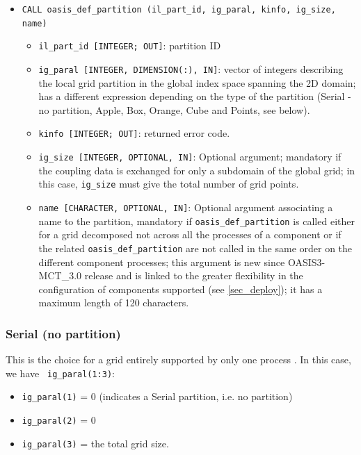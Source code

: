 \begin{itemize}

  \vspace{0.2cm}
\item {\tt CALL oasis\_def\_partition (il\_part\_id, ig\_paral,
    kinfo, ig\_size, name)} 

  \begin{itemize}
  \item {\tt il\_part\_id [INTEGER; OUT]}: partition ID
  \item {\tt ig\_paral [INTEGER, DIMENSION(:), IN]}: vector of
    integers describing the local grid partition in the global index space spanning the 2D domain;
    has a different expression depending on the type of the partition (Serial -no
    partition, Apple, Box, Orange, Cube and Points, see below).
  \item {\tt kinfo [INTEGER; OUT]}: returned error code.
  \item {\tt ig\_size [INTEGER, OPTIONAL, IN]}: Optional argument; mandatory
    if the coupling data is exchanged for only a subdomain of the
    global grid; in this case, {\tt ig\_size} must give the total number of grid points.
  \item {\tt name [CHARACTER, OPTIONAL, IN]}: Optional argument associating a name to the partition,
    mandatory if {\tt oasis\_def\_partition} is called either for a grid
    decomposed not across all the processes of a component or if the related {\tt oasis\_def\_partition} are not
    called in the same order on the different component processes;
    this argument is new since OASIS3-MCT\_3.0 release and is linked to the
    greater flexibility in the configuration of components supported
    (see \ref{sec_deploy}); it has a maximum length of 120 characters.
  \end{itemize}
\end{itemize}

\subsubsection{Serial (no partition)}

This is the choice for a grid entirely supported by only one process . In this case, we have {\tt
  ig\_paral(1:3)}:
\begin{itemize}
\item {\tt ig\_paral(1)} = 0 (indicates a Serial partition, i.e. no partition)
\item {\tt ig\_paral(2)} = 0
\item {\tt ig\_paral(3)} = the total grid size.
\end{itemize}

